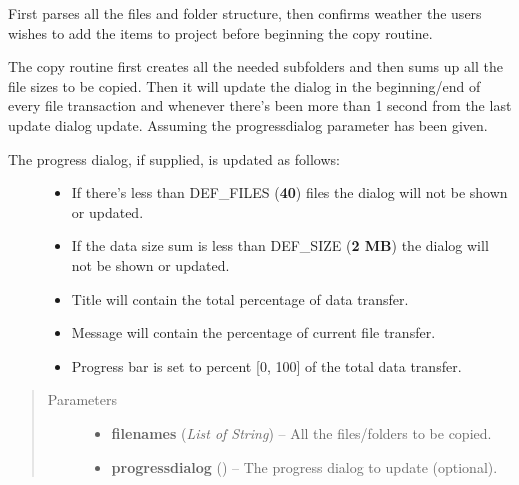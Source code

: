 \documentclass[letterpaper,10pt,english]{sphinxmanual}
\begin{document}
\begin{fulllineitems}
\begin{fulllineitems}
First parses all the files and folder structure, then confirms weather
the users wishes to add the items to project before beginning the copy
routine.

The copy routine first creates all the needed subfolders and then sums
up all the file sizes to be copied. Then it will update the dialog
in the beginning/end of every file transaction and whenever there's
been more than 1 second from the last update dialog update. Assuming
the progressdialog parameter has been given.
\begin{description}
\item[{The progress dialog, if supplied, is updated as follows:}] \leavevmode\begin{itemize}
\item {} 
If there's less than DEF\_FILES (\textbf{40}) files the dialog             will not be shown or updated.

\item {} 
If the data size sum is less than DEF\_SIZE (\textbf{2 MB}) the             dialog will not be shown or updated.

\item {} 
Title will contain the total percentage of data transfer.

\item {} 
Message will contain the percentage of current file transfer.

\item {} 
Progress bar is set to percent {[}0, 100{]} of the total data             transfer.

\end{itemize}

\end{description}
\begin{quote}\begin{description}
\item[{Parameters}] \leavevmode\begin{itemize}
\item {} 
\textbf{filenames} (\emph{List of String}) -- All the files/folders to be copied.

\item {} 
\textbf{progressdialog} () -- The progress dialog to update (optional).

\end{itemize}

\end{description}\end{quote}


\end{fulllineitems}
\end{fulllineitems}
\end{document}
